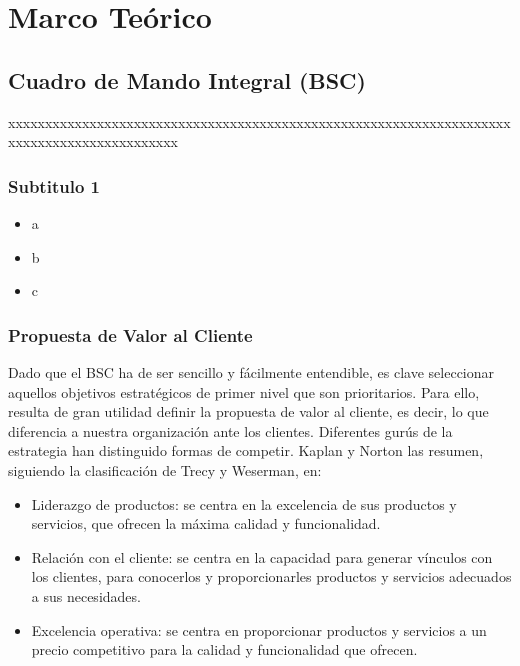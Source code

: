\documentclass[preprint,12pt]{elsarticle}
\begin{document}


\section{Marco Teórico}

	\subsection{\textbf{Cuadro de Mando Integral (BSC)}}
	
xxxxxxxxxxxxxxxxxxxxxxxxxxxxxxxxxxxxxxxxxxxxxxxxxxxxxxxxxxxxxxxxxxxxxxxxxxxxxxxxxxxxxxxxxxx\cite{referenciarobles1}

\subsubsection{\textbf{Subtitulo 1}}

	\begin{itemize}
	\item a
	\item b
	\item c
	\end{itemize}



\subsubsection{\textbf{Propuesta de Valor al Cliente}}


Dado que el BSC ha de ser sencillo y fácilmente entendible, es clave seleccionar aquellos objetivos estratégicos de primer nivel que son prioritarios. Para ello, resulta de gran utilidad definir la propuesta de valor al cliente, es decir, lo que diferencia a nuestra organización ante los clientes. Diferentes gurús de la estrategia han distinguido formas de competir. Kaplan y Norton las resumen, siguiendo la clasificación de Trecy y Weserman, en:

	\begin{itemize}
	\item Liderazgo de productos: se centra en la excelencia de sus productos y servicios, que ofrecen la máxima calidad y funcionalidad.
	\item Relación con el cliente: se centra en la capacidad para generar vínculos con los clientes, para conocerlos y proporcionarles productos y servicios adecuados a sus necesidades.
	\item Excelencia operativa: se centra en proporcionar productos y servicios a un precio competitivo para la calidad y funcionalidad que ofrecen.
	\end{itemize}
\end{document}
